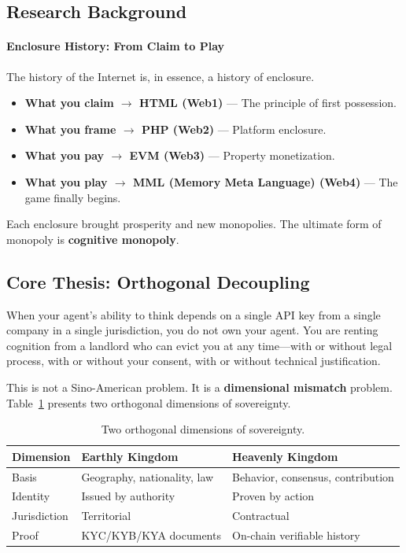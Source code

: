 \documentclass[11pt,a4paper]{article}
\begin{document}
\subsection{Research Background}
\label{sub:background}

\paragraph{Enclosure History: From Claim to Play}
The history of the Internet is, in essence, a history of enclosure.
\begin{itemize}
  \item \textbf{What you claim $\to$ HTML (Web1)} --- The principle of first possession.
  \item \textbf{What you frame $\to$ PHP (Web2)} --- Platform enclosure.
  \item \textbf{What you pay $\to$ EVM (Web3)} --- Property monetization.
  \item \textbf{What you play $\to$ MML (Memory Meta Language) (Web4)} --- The game finally begins.
\end{itemize}

Each enclosure brought prosperity and new monopolies.
The ultimate form of monopoly is \textbf{cognitive monopoly}.

\subsection{Core Thesis: Orthogonal Decoupling}
\label{sub:orthogonal}

When your agent's ability to think depends on a single API key from a single company in a single jurisdiction, you do not own your agent.
You are renting cognition from a landlord who can evict you at any time---with or without legal process, with or without your consent, with or without technical justification.

This is not a Sino-American problem.
It is a \textbf{dimensional mismatch} problem.
Table~\ref{tab:sovereignty} presents two orthogonal dimensions of sovereignty.

\begin{table}[ht]
\centering
\caption{Two orthogonal dimensions of sovereignty.}
\label{tab:sovereignty}
\small
\begin{tabular}{@{}lll@{}}
\toprule
\textbf{Dimension} & \textbf{Earthly Kingdom} & \textbf{Heavenly Kingdom} \\
\midrule
Basis      & Geography, nationality, law & Behavior, consensus, contribution \\
Identity   & Issued by authority         & Proven by action                  \\
Jurisdiction & Territorial               & Contractual                     \\
Proof      & KYC/KYB/KYA documents      & On-chain verifiable history     \\
\bottomrule
\end{tabular}
\end{table}
\end{document}
